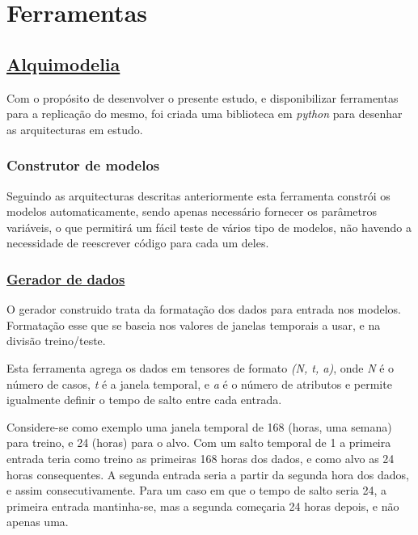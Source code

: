 \section{Ferramentas}

\subsection{\href{https://github.com/alquimodelia/alquimodelia}{Alquimodelia}\label{se:alquimodelia}}


Com o propósito de desenvolver o presente estudo, e disponibilizar ferramentas para a replicação do mesmo, foi criada uma biblioteca em \textit{python} para desenhar as arquitecturas em estudo.\par

\subsubsection{Construtor de modelos}

Seguindo as arquitecturas descritas anteriormente esta ferramenta constrói os modelos automaticamente, sendo apenas necessário fornecer os parâmetros variáveis, o que permitirá um fácil teste de vários tipo de modelos, não havendo a necessidade de reescrever código para cada um deles.\par

\subsubsection{\href{https://github.com/alquimodelia/alquitable/blob/main/alquitable/generator.py}{Gerador de dados}}

O gerador construido trata da formatação dos dados para entrada nos modelos. Formatação esse que se baseia nos valores de janelas temporais a usar, e na divisão treino/teste.\par
Esta ferramenta agrega os dados em tensores de formato \textit{(N, t, a)}, onde \textit{N} é o número de casos, \textit{t} é a janela temporal, e \textit{a} é o número de atributos e permite igualmente definir o tempo de salto entre cada entrada.\par
Considere-se como exemplo uma janela temporal de 168 (horas, uma semana) para treino, e 24 (horas) para o alvo. Com um salto temporal de 1 a primeira entrada teria como treino as primeiras 168 horas dos dados, e como alvo as 24 horas consequentes. A segunda entrada seria a partir da segunda hora dos dados, e assim consecutivamente. Para um caso em que o tempo de salto seria 24, a primeira entrada mantinha-se, mas a segunda começaria 24 horas depois, e não apenas uma.\par

